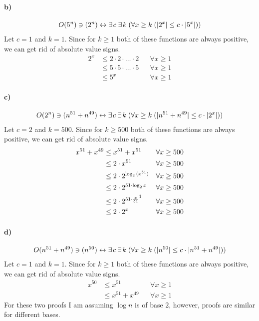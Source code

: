\documentclass[12pt]{article}
\newcommand\+{\mkern2mu}
\begin{document}
\paragraph{b)} %
\begin{gather*}
O(5^n) \ni (2^n) \leftrightarrow \exists \+ c \; \exists \+ k \; (\forall x \geq k \; (\vert 2^x \vert \leq c \cdot \vert 5^x \vert))
\end{gather*}
Let $c = 1$ and $k = 1$.
Since for $k \geq 1$ both of these functions are always positive, we can get rid of absolute value signs.
\begin{align*}
2^x &\leq 2 \cdot 2 \cdot \dotso \cdot 2 && \forall x \geq 1 \\
&\leq 5 \cdot 5 \cdot \dotso \cdot 5 && \forall x \geq 1 \\
&\leq 5^x && \forall x \geq 1
\end{align*}
\paragraph{c)}
\begin{gather*}
O(2^n) \ni (n^{51}+n^{49}) \leftrightarrow \exists \+ c \; \exists \+ k \; (\forall x \geq k \; (\vert n^{51}+n^{49} \vert \leq c \cdot \vert 2^x \vert))
\end{gather*}
Let $c = 2$ and $k = 500$.
Since for $k \geq 500$ both of these functions are always positive, we can get rid of absolute value signs.
\begin{align*}
x^{51}+x^{49} &\leq x^{51}+x^{51} && \forall x \geq 500 \\
&\leq 2 \cdot x^{51} && \forall x \geq 500 \\
&\leq 2 \cdot 2^{\log_2{(x^{51})}} && \forall x \geq 500 \\
&\leq 2 \cdot 2^{51 \cdot \log_2{x}} && \forall x \geq 500 \\
&\leq 2 \cdot 2^{51 \cdot \frac{x}{51}\footnotemark} && \forall x \geq 500 \\
&\leq 2 \cdot 2^{x} && \forall x \geq 500
\end{align*}
\paragraph{d)}
\begin{gather*}
O(n^{51}+n^{49}) \ni (n^{50}) \leftrightarrow \exists \+ c \; \exists \+ k \; (\forall x \geq k \; (\vert n^{50} \vert \leq c \cdot \vert n^{51}+n^{49} \vert))
\end{gather*}
Let $c = 1$ and $k = 1$.
Since for $k \geq 1$ both of these functions are always positive, we can get rid of absolute value signs.
\begin{align*}
x^{50} &\leq x^{51} && \forall x \geq 1 \\
&\leq x^{51}+x^{49} && \forall x \geq 1
\end{align*}
For these two proofs I am assuming $\log{n}$ is of base $2$, however, proofs are similar for different bases.
\end{document}
